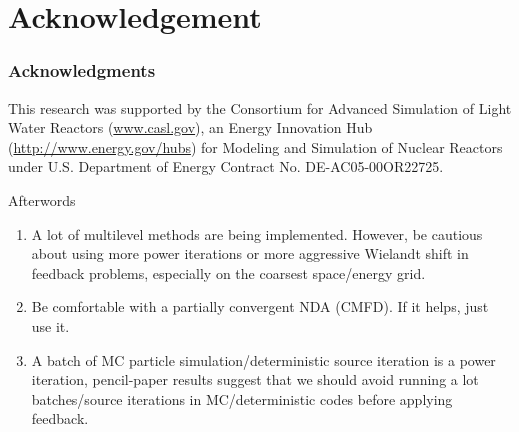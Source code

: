 \section{Acknowledgement}
\begin{frame}
    \frametitle{Acknowledgments}
\begin{center}
 This research was supported by the Consortium for Advanced Simulation of Light Water Reactors (\url{www.casl.gov}), an Energy Innovation Hub (\url{http://www.energy.gov/hubs}) for Modeling and Simulation of Nuclear Reactors under U.S. Department of Energy Contract No. DE-AC05-00OR22725.
\end{center}
\vfill
\end{frame}

\begin{frame}{Afterwords}
\begin{enumerate}
    \item A lot of multilevel methods are being implemented. However, be cautious about using more power iterations or more aggressive Wielandt shift in feedback problems, especially on the coarsest space/energy grid.
    \item Be comfortable with a partially convergent NDA (CMFD). If it helps, just use it.
    \item A batch of MC particle simulation/deterministic source iteration is a power iteration, pencil-paper results suggest that we should avoid running a lot batches/source iterations in MC/deterministic codes before applying feedback.
\end{enumerate}
\end{frame}